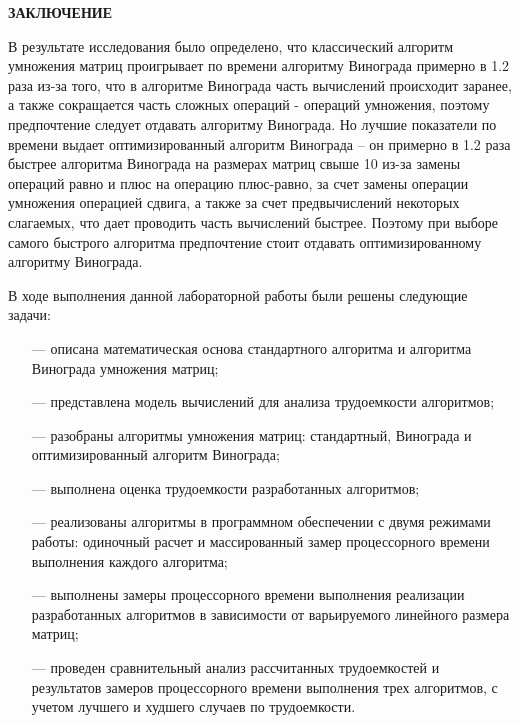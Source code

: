 \begin{center}
    \textbf{ЗАКЛЮЧЕНИЕ}
\end{center}

В результате исследования было определено, что классический алгоритм умножения матриц проигрывает по времени алгоритму Винограда примерно в 1.2 раза из-за того, что в алгоритме Винограда часть вычислений происходит заранее, а также сокращается часть сложных операций - операций умножения, поэтому предпочтение следует отдавать алгоритму Винограда. Но лучшие показатели по времени выдает оптимизированный алгоритм Винограда -- он примерно в 1.2 раза быстрее алгоритма Винограда на размерах матриц свыше 10 из-за замены операций равно и плюс на операцию плюс-равно, за счет замены операции умножения операцией сдвига, а также за счет предвычислений некоторых слагаемых, что дает проводить часть вычислений быстрее. Поэтому при выборе самого быстрого алгоритма предпочтение стоит отдавать оптимизированному алгоритму Винограда.

\vspace{5mm}

В ходе выполнения данной лабораторной работы были решены следующие задачи:
\begin{itemize} \item[---] описана математическая основа стандартного алгоритма и алгоритма Винограда умножения матриц; \item[---] представлена модель вычислений для анализа трудоемкости алгоритмов; \item[---] разобраны алгоритмы умножения матриц: стандартный, Винограда и оптимизированный алгоритм Винограда; \item[---] выполнена оценка трудоемкости разработанных алгоритмов; \item[---] реализованы алгоритмы в программном обеспечении с двумя режимами работы: одиночный расчет и массированный замер процессорного времени выполнения каждого алгоритма; \item[---] выполнены замеры процессорного времени выполнения реализации разработанных алгоритмов в зависимости от варьируемого линейного размера матриц; \item[---] проведен сравнительный анализ рассчитанных трудоемкостей и результатов замеров процессорного времени выполнения трех алгоритмов, с учетом лучшего и худшего случаев по трудоемкости. \end{itemize}